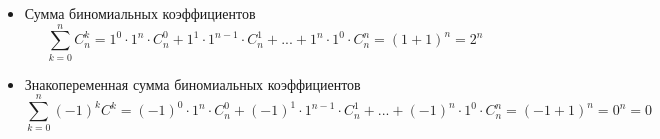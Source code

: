 \begin{itemize}
	\item Сумма биномиальных коэффициентов
	$$\sum_{k=0}^{n}C^k_n = 1^0 \cdot 1^n \cdot C^0_n + 1^1 \cdot 1^{n-1} \cdot C^1_n + ... + 1^n \cdot 1^0 \cdot C^n_n  = (1 + 1)^n = 2^n$$
	
	\item Знакопеременная сумма биномиальных коэффициентов
	$$\sum_{k=0}^{n}(-1)^kC^k = (-1)^0 \cdot 1^n \cdot C^0_n + (-1)^1 \cdot 1^{n-1} \cdot C^1_n + ... + (-1)^n \cdot 1^0 \cdot C^n_n  = (-1 + 1)^n = 0^n = 0$$

\end{itemize}